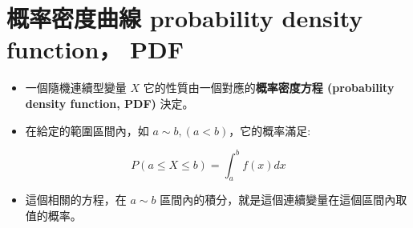 \documentclass[]{ctexbook}
\providecommand{\tightlist}{%
  \setlength{\itemsep}{0pt}\setlength{\parskip}{0pt}}
\begin{document}
\section{概率密度曲線 probability density function，
PDF}\label{-probability-density-function-pdf}

\begin{itemize}
\item
  一個隨機連續型變量 \(X\) 它的性質由一個對應的\textbf{概率密度方程
  (probability density function, PDF)} 決定。
\item
  在給定的範圍區間內，如 \(a\sim b, (a < b)\)，它的概率滿足:
\end{itemize}

\[P(a\leqslant X \leqslant b) = \int_a^bf(x)dx\]

\begin{itemize}
\tightlist
\item
  這個相關的方程，在 \(a\sim b\)
  區間內的積分，就是這個連續變量在這個區間內取值的概率。
\end{itemize}
\end{document}
